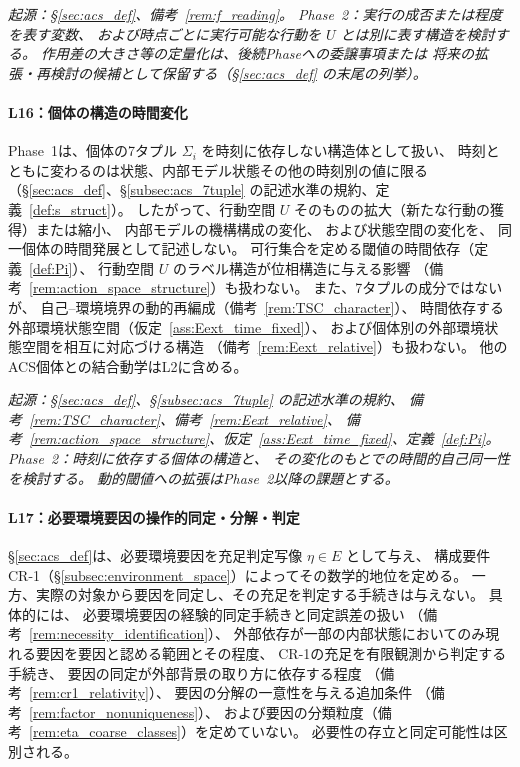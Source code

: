 \medskip
\noindent\textit{起源：\S\ref{sec:acs_def}、備考~\ref{rem:f_reading}。
Phase~2：実行の成否または程度を表す変数、
および時点ごとに実行可能な行動を $U$ とは別に表す構造を検討する。
作用差の大きさ等の定量化は、後続Phaseへの委譲事項または
将来の拡張・再検討の候補として保留する（\S\ref{sec:acs_def} の末尾の列挙）。}

\paragraph{L16：個体の構造の時間変化}
\label{lim:L16}
Phase~1は、個体の7タプル $\Sigma_i$ を時刻に依存しない構造体として扱い、
時刻とともに変わるのは状態、内部モデル状態その他の時刻別の値に限る
（\S\ref{sec:acs_def}、\S\ref{subsec:acs_7tuple} の記述水準の規約、定義~\ref{def:s_struct}）。
したがって、行動空間 $U$ そのものの拡大（新たな行動の獲得）または縮小、
内部モデルの機構構成の変化、
および状態空間の変化を、
同一個体の時間発展として記述しない。
可行集合を定める閾値の時間依存（定義~\ref{def:Pi}）、
行動空間 $U$ のラベル構造が位相構造に与える影響
（備考~\ref{rem:action_space_structure}）も扱わない。
また、7タプルの成分ではないが、
自己--環境境界の動的再編成（備考~\ref{rem:TSC_character}）、
時間依存する外部環境状態空間（仮定~\ref{ass:Eext_time_fixed}）、
および個体別の外部環境状態空間を相互に対応づける構造
（備考~\ref{rem:Eext_relative}）も扱わない。
他のACS個体との結合動学はL2に含める。

\medskip
\noindent\textit{起源：\S\ref{sec:acs_def}、\S\ref{subsec:acs_7tuple} の記述水準の規約、
備考~\ref{rem:TSC_character}、備考~\ref{rem:Eext_relative}、
備考~\ref{rem:action_space_structure}、仮定~\ref{ass:Eext_time_fixed}、定義~\ref{def:Pi}。
Phase~2：時刻に依存する個体の構造と、
その変化のもとでの時間的自己同一性を検討する。
動的閾値への拡張はPhase~2以降の課題とする。}

\paragraph{L17：必要環境要因の操作的同定・分解・判定}
\label{lim:L17}
\S\ref{sec:acs_def}は、必要環境要因を充足判定写像 $\eta\in E$ として与え、
構成要件CR-1（\S\ref{subsec:environment_space}）によってその数学的地位を定める。
一方、実際の対象から要因を同定し、その充足を判定する手続きは与えない。
具体的には、
必要環境要因の経験的同定手続きと同定誤差の扱い
（備考~\ref{rem:necessity_identification}）、
外部依存が一部の内部状態においてのみ現れる要因を要因と認める範囲とその程度、
CR-1の充足を有限観測から判定する手続き、
要因の同定が外部背景の取り方に依存する程度
（備考~\ref{rem:cr1_relativity}）、
要因の分解の一意性を与える追加条件
（備考~\ref{rem:factor_nonuniqueness}）、
および要因の分類粒度（備考~\ref{rem:eta_coarse_classes}）を定めていない。
必要性の存立と同定可能性は区別される。

